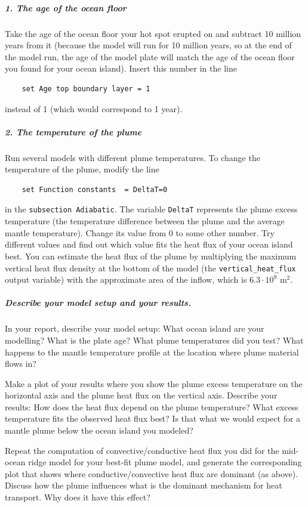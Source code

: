 \subparagraph{1. The age of the ocean floor}
Take the age of the ocean floor your hot spot erupted on and subtract 10 million years from it (because the model will run for 10 million years, so at the end of the model run, the age of the model plate will match the age of the ocean floor you found for your ocean island). 
Insert this number in the line

\begin{verbatim}
    set Age top boundary layer = 1
\end{verbatim}

instead of 1 (which would correspond to 1 year). 

\subparagraph{2. The temperature of the plume}
Run several models with different plume temperatures. To change the temperature of the plume, modify the line

\begin{verbatim}
    set Function constants  = DeltaT=0
\end{verbatim}

in the \texttt{subsection Adiabatic}. The variable \texttt{DeltaT} represents the plume excess temperature (the temperature difference between the plume and the average mantle temperature). Change its value from 0 to some other number. Try different values and find out which value fits the heat flux of your ocean island best. You can estimate the heat flux of the plume by multiplying the maximum vertical heat flux density at the bottom of the model (the \texttt{vertical\_heat\_flux} output variable) with the approximate area of the inflow, which is $6.3 \cdot 10^9$ m$^2$. 

\subparagraph{Describe your model setup and your results.}
In your report, describe your model setup: What ocean island are your modelling? What is the plate age? What plume temperatures did you test? What happens to the mantle temperature profile at the location where plume material flows in?

Make a plot of your results where you show the plume excess temperature on the horizontal axis and the plume heat flux on the vertical axis. Describe your results: How does the heat flux depend on the plume temperature? What excess temperature fits the observed heat flux best? Is that what we would expect for a mantle plume below the ocean island you modeled? 

Repeat the computation of convective/conductive heat flux you did for the mid-ocean ridge model for your best-fit plume model, 
and generate the corresponding plot that shows where conductive/convective heat flux are dominant (as above). Discuss how the plume influences what is the dominant mechanism for heat transport. Why does it have this effect?

